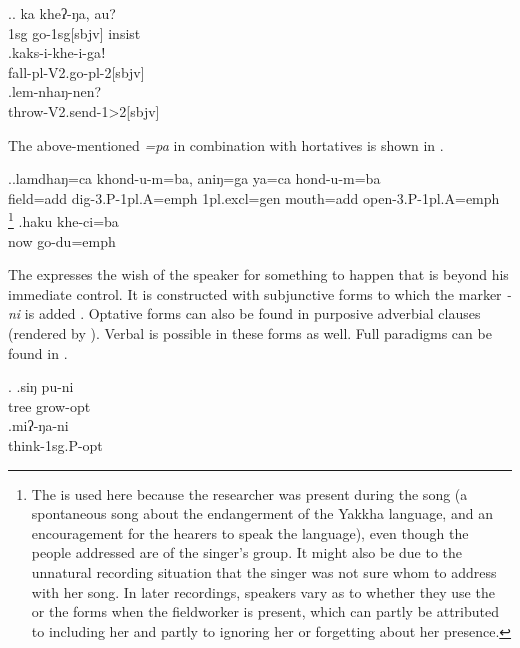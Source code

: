 \ex.\ag. ka kheʔ-ŋa, au?\\
  {\sc 1sg} go{\sc -1sg[sbjv]} {\sc insist}\\
  \bg.kaks-i-khe-i-gaǃ\\
  fall{\sc -pl-V2.go-pl-2[sbjv]}\\
  \bg.lem-nhaŋ-nen?\\
  throw{\sc -V2.send-1>2[sbjv]}\\
  
The above-mentioned  \emph{=pa} in combination with hortatives is shown in \Next.
  
  \ex.\ag.lamdhaŋ=ca        khond-u-m=ba, aniŋ=ga ya=ca           hond-u-m=ba\\
 field{\sc =add} dig{\sc -3.P-1pl.A=emph} {\sc 1pl.excl=gen} mouth{\sc =add} open{\sc -3.P-1pl.A=emph}\\
 \footnote{The  is used here because the researcher was present during the song (a spontaneous song about the endangerment of the Yakkha language, and an encouragement for the hearers to speak the language), even though the people addressed are of the singer's group. It might also be due to the unnatural recording situation that the singer was not sure whom to address with her song. In later recordings, speakers vary as to whether they use the  or the  forms when the fieldworker is present, which can partly be attributed to including her and partly to ignoring her or forgetting about her presence.}  
  \bg.haku khe-ci=ba\\
  now go{\sc -du=emph}\\
  
  
  The  expresses the wish of the speaker for something to happen that is beyond his immediate control. It is constructed with subjunctive forms to which the marker \emph{-ni}  is added \Next. Optative forms can also be found in purposive adverbial clauses (rendered by ). Verbal  is possible in these forms as well. Full paradigms can be found in .
  
  \ex. \ag.siŋ pu-ni\\
  tree grow{\sc [3sg]-opt}\\
  \bg.miʔ-ŋa-ni\\
  think{\sc -1sg.P-opt}\\
 
